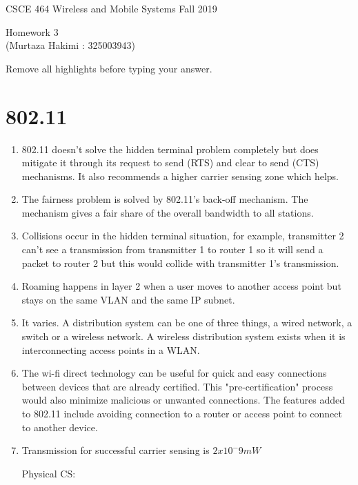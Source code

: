 \documentclass[11pt]{article}
\begin{document}
\newcommand{\answer}[1]{\mbox{~}}

{\large  CSCE 464 Wireless and Mobile Systems  \hfill Fall 2019\\
 \begin{center}
   Homework 3 \\
   ({Murtaza Hakimi : 325003943}) \\
    \end{center}
}

Remove all highlights before typing your answer.

\section{802.11}
\begin{enumerate}[label=(\alph*)]
\item {
	802.11 doesn't solve the hidden terminal problem completely but does mitigate it through 
	its request to send (RTS) and clear to send (CTS) mechanisms. It also recommends a higher
	carrier sensing zone which helps.
}
\item {
	The fairness problem is solved by 802.11's back-off mechanism. The mechanism gives a 
	fair share of the overall bandwidth to all stations. 
}
\item {
	Collisions occur in the hidden terminal situation, for example, transmitter 2 can't see a
	transmission from transmitter 1 to router 1 so it will send a packet to router 2 but this would
	collide with transmitter 1's transmission. 
}
\item {
	Roaming happens in layer 2 when a user moves to another access point but stays on the same
	VLAN and the same IP subnet. 
}
\item {
	It varies. A distribution system can be one of three things, a wired network, a switch or a 
	wireless network. A wireless distribution system exists when it is interconnecting access
	points in a WLAN.
}
\item {
	The wi-fi direct technology can be useful for quick and easy connections between devices 
	that are already certified. This "pre-certification" process would also minimize malicious or
	unwanted connections. The features added to 802.11 include avoiding connection to a router
	or access point to connect to another device. 
}
\item {
	Transmission for successful carrier sensing is $2x10^-9 mW$
	
	Physical CS:
	
}
\end{enumerate}
\end{document}
